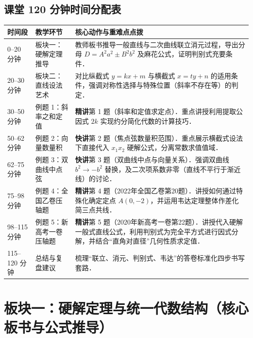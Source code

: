 \documentclass[11pt,a4paper]{ctexart}
\begin{document}
\subsection*{课堂 120 分钟时间分配表}
\begin{tabularx}{\textwidth}{p{2.2cm}p{3.0cm}X}
\toprule
时间段 & 教学环节 & 核心动作与重难点点拨\\
\midrule
0--20 分钟 & 板块一：硬解定理推导 & 教师板书推导一般直线与二次曲线联立消元过程，导出分母 $D=A^2a^2 \pm B^2b^2$ 及麻花公式，证明判别式充要条件．\\ \hline
20--30 分钟 & 板块二：直线设法艺术 & 对比纵截式 $y=kx+m$ 与横截式 $x=ty+n$ 的适用条件，强调对称性选择与特殊位置（斜率不存在等）的判定．\\ \hline
30--50 分钟 & 例题 1：斜率之和定值 & \textbf{精讲}第 1 题（斜率和定值求定点）．重点讲授利用提取公因式 $2k$ 实现约分简化代数的计算技巧．\\ \hline
50--62 分钟 & 例题 2：向量数量积 & \textbf{快讲}第 2 题（焦点弦数量积范围）．重点展示横截式设法下直接代入 $x_1x_2$ 硬解公式，分离常数求值值域．\\ \hline
62--75 分钟 & 例题 3：双曲线中点弦 & \textbf{快讲}第 3 题（双曲线中点与向量关系）．强调双曲线 $b^2 \to -b^2$ 替换，及二次项系数非零（直线不平行于渐近线）的讨论．\\ \hline
75--98 分钟 & 例题 4：全国乙卷压轴题 & \textbf{精讲}第 4 题（2022年全国乙卷第20题）．讲授如何通过特殊化确定定点 $A(0,-2)$，并运用韦达定理整体作差化简三点共线．\\ \hline
98--115 分钟 & 例题 5：新高考一卷压轴题 & \textbf{精讲}第 5 题（2020年新高考一卷第22题）．讲授代入硬解一般式直线公式，利用判别式为完全平方式进行因式分解，并结合“直角对直径”几何性质求定值．\\ \hline
115--120 分钟 & 总结与复盘建议 & 梳理“联立、消元、判别式、韦达”的答卷标准化四步书写套路．\\
\bottomrule
\end{tabularx}

\newpage

\section{板块一：硬解定理与统一代数结构（核心板书与公式推导）}
\end{document}
